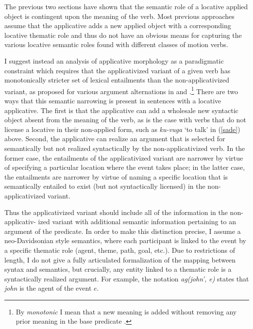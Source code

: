 \documentclass[output=paper]{langsci/langscibook}
\begin{document}
 

  The previous two sections have shown that the semantic role of a locative applied object is contingent upon the meaning of the verb. Most previous approaches assume that the applicative adds a new applied object with a corresponding {\sc locative} thematic role and thus do not have an obvious means for capturing the various locative semantic roles found with different classes of motion verbs.

I suggest instead an analysis of applicative morphology as a paradigmatic constraint which requires that the applicativized variant of a given verb has monotonically stricter set of lexical entailments than the non-applicativized variant, as proposed for various argument alternations in \citet{ackermanmoore:2001} and \citet{beavers:2010b}.\footnote{By \emph{monotonic} I mean that a new meaning is added without removing any prior meaning in the base predicate \citep{akg:2007, akg:2012}.} There are two ways that this semantic narrowing is present in sentences with a locative applicative. The first is that the applicative can add a wholesale new syntactic object absent from the meaning of the verb, as is the case with verbs that do not license a {\sc locative} in their non-applied form, such as \emph{ku-vuga} `to talk'  in (\ref{sade}) above. Second, the applicative can realize an argument that is selected for semantically but not realized syntactically by the non-applicativized verb. In the former case, the entailments of the applicativized variant are narrower by virtue of specifying a particular location where the event takes place; in the latter case, the entailments are narrower by virtue of naming a specific location that is semantically entailed to exist (but not syntactically licensed) in the non-applicativized variant. 
 
 Thus the applicativized variant should include all of the information in the non-applicativ- ized variant with additional semantic information pertaining to an argument of the predicate. In order to make this distinction precise, I assume a neo-Davidsonian style semantics, where each participant is linked to the event by a specific thematic role ({\sc agent, theme, path, goal,} etc.). Due to restrictions of length, I do not give a fully articulated formalization of the mapping between syntax and semantics, but crucially, any entity linked to a thematic role is a syntactically realized argument. For example, the notation \emph{ag(john', e)} states that  \emph{john} is the {\sc agent} of the event $e$.
	 
\end{document}
